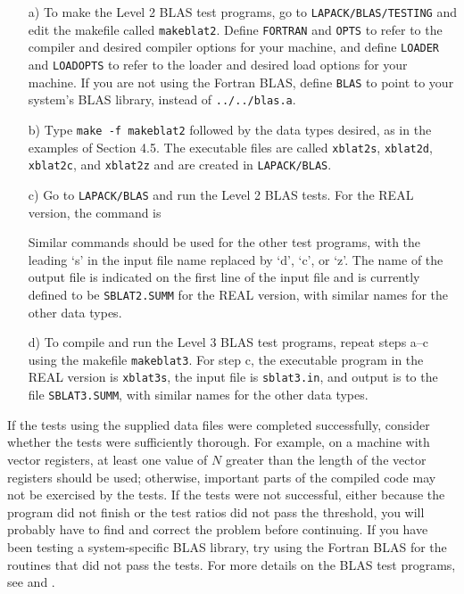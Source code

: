 \begin{itemize}
\item[a)]
To make the Level 2 BLAS test programs,
go to {\tt LAPACK/BLAS/TESTING} and
edit the makefile called {\tt makeblat2}. 
Define {\tt FORTRAN} and {\tt OPTS} to refer to the compiler and
desired compiler
options for your machine, and define {\tt LOADER} and {\tt LOADOPTS}
to refer to the loader and desired load options for your machine.  
If you are not using the Fortran BLAS, define {\tt BLAS} to point to
your system's BLAS library, instead of {\tt ../../blas.a}.

\item[b)]
Type {\tt make -f makeblat2} followed by the data types desired, as in
the examples of Section 4.5.
The executable files are called {\tt xblat2s}, {\tt xblat2d},
{\tt xblat2c}, and {\tt xblat2z} and are created in {\tt LAPACK/BLAS}.

\item[c)]
Go to {\tt LAPACK/BLAS} and run the Level 2 BLAS tests.
For the REAL version, the command is
Similar commands should be used for the other test programs, with
the leading `s' in the input file name replaced by `d', `c', or `z'.
The name of the output file is indicated on the first line of the
input file and is currently defined to be {\tt SBLAT2.SUMM} for
the REAL version, 
with similar names for the other data types.

\item[d)]
To compile and run the Level 3 BLAS test programs,
repeat steps a--c using the makefile {\tt makeblat3}. 
For step c, the executable program in the REAL version is
{\tt xblat3s}, the input file is {\tt sblat3.in}, 
and output is to the file {\tt SBLAT3.SUMM}, with
similar names for the other data types.  
\end{itemize}

If the tests using the supplied data files were completed successfully,
consider whether the tests were sufficiently thorough.
For example, on a machine with vector registers, at least one value
of $N$ greater than the length of the vector registers should be used;
otherwise, important parts of the compiled code may not be
exercised by the tests. 
If the tests were not successful, either because the program did not
finish or the test ratios did not pass the threshold, you will
probably have to find and correct the problem before continuing. 
If you have been testing a system-specific
BLAS library, try using the Fortran BLAS for the routines that
did not pass the tests.
For more details on the BLAS test programs, 
see \cite{BLAS2-test} and \cite{BLAS3-test}.

